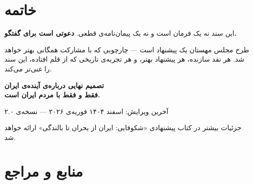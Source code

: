 \documentclass[12pt,a4paper,twoside,openany]{book}
\begin{document}
	\chapter*{خاتمه}
	
	\begin{summarybox}
		این سند نه یک فرمان است و نه یک پیمان‌نامه‌ی قطعی. \textbf{دعوتی است برای گفتگو.}
		
		طرح مجلس مهستان یک پیشنهاد است --- چارچوبی که با مشارکت همگانی بهتر خواهد شد.
		هر نقد سازنده، هر پیشنهاد بهتر، و هر تجربه‌ی تاریخی که از قلم افتاده، این سند را
		غنی‌تر می‌کند.
		
		\begin{center}
			{\large\color{MahestanDarkBlue}\bfseries
				تصمیم نهایی درباره‌ی آینده‌ی ایران\\[0.3em]
				فقط و فقط با مردم ایران است.}
		\end{center}
	\end{summarybox}
	
	\vspace{2cm}
	\begin{flushright}
		\small\color{MahestanGray}
		آخرین ویرایش: اسفند ۱۴۰۴ \lr{/} فوریه‌ی ۲۰۲۶ --- نسخه‌ی ۲.۰
		
		\vspace{0.3cm}
		جزئیات بیشتر در کتاب پیشنهادی «شکوفایی: ایران از بحران تا بالندگی» ارائه خواهد شد.
	\end{flushright}
	
	\backmatter
	\chapter*{منابع و مراجع}
	
\end{document}
